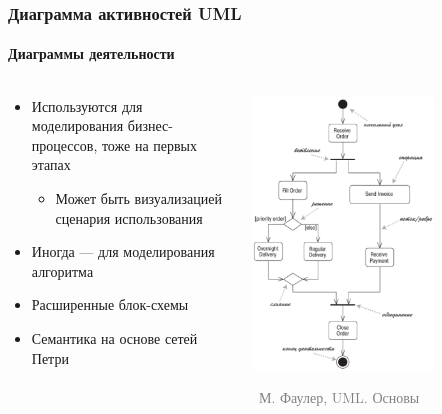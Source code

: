\documentclass[xetex,mathserif,serif]{beamer}
\newcommand{\attribution}[1] {
    \vspace{-5mm}\begin{flushright}\begin{scriptsize}\textcolor{gray}{\textcopyright\, #1}\end{scriptsize}\end{flushright}
}
\begin{document}
    \begin{frame}
        \frametitle{Диаграмма активностей UML}
        \framesubtitle{Диаграммы деятельности}
        \begin{columns}
            \begin{column}{0.5\textwidth}
                \begin{itemize}
                    \item Используются для моделирования бизнес-процессов, тоже на первых этапах
                    \begin{itemize}
                        \item Может быть визуализацией сценария использования
                    \end{itemize}
                    \item Иногда --- для моделирования алгоритма
                    \item Расширенные блок-схемы
                    \item Семантика на основе сетей Петри
                \end{itemize}
            \end{column}
            \begin{column}{0.5\textwidth}
                \begin{center}
                    \includegraphics[width=0.7\textwidth]{activityDiagram.png}
                    \attribution{М. Фаулер, UML. Основы}
                \end{center}
            \end{column}
        \end{columns}
    \end{frame}
\end{document}
